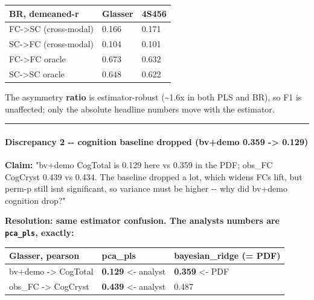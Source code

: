 {\def\LTcaptype{none} %
\begin{longtable}[]{@{}lll@{}}
\toprule\noalign{}
BR, demeaned-r & Glasser & 4S456 \\
\midrule\noalign{}
\endhead
\bottomrule\noalign{}
\endlastfoot
FC-\textgreater SC (cross-modal) & 0.166 & 0.171 \\
SC-\textgreater FC (cross-modal) & 0.104 & 0.101 \\
FC-\textgreater FC oracle & 0.673 & 0.632 \\
SC-\textgreater SC oracle & 0.648 & 0.622 \\
\end{longtable}
}

The asymmetry \textbf{ratio} is estimator-robust (\textasciitilde1.6x in both PLS and BR), so F1 is unaffected; only the absolute headline numbers move with the estimator.

\begin{center}\rule{0.5\linewidth}{0.5pt}\end{center}

\paragraph{Discrepancy 2 -\/- cognition baseline dropped (bv+demo 0.359 -\textgreater{} 0.129)}\label{discrepancy-2----cognition-baseline-dropped-bvdemo-0359---0129}

\textbf{Claim:} "bv+demo CogTotal is 0.129 here vs 0.359 in the PDF; obs\_FC CogCryst 0.439 vs 0.434. The baseline dropped a lot, which widens FC\textquotesingle s lift, but perm-p still isn\textquotesingle t significant, so variance must be higher -\/- why did bv+demo cognition drop?"

\textbf{Resolution: same estimator confusion. The analyst\textquotesingle s numbers are \texttt{pca\_pls}, exactly:}

{\def\LTcaptype{none} %
\begin{longtable}[]{@{}lll@{}}
\toprule\noalign{}
Glasser, pearson & pca\_pls & bayesian\_ridge (= PDF) \\
\midrule\noalign{}
\endhead
\bottomrule\noalign{}
\endlastfoot
bv+demo -\textgreater{} CogTotal & \textbf{0.129} \textless- analyst & \textbf{0.359} \textless- PDF \\
obs\_FC -\textgreater{} CogCryst & \textbf{0.439} \textless- analyst & 0.487 \\
\end{longtable}
}

